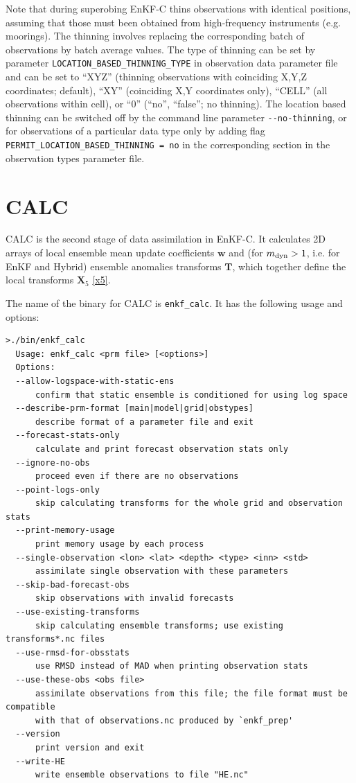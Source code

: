 \documentclass[11pt]{report}
\newcommand{\mb} {\mathbf}
\newcommand*\subtxt[1]{_{\textnormal{#1}}}
\begin{document}
Note that during superobing EnKF-C thins observations with identical positions, assuming that those must been obtained from high-frequency instruments (e.g. moorings).
The thinning involves replacing the corresponding batch of observations by batch average values.
The type of thinning can be set by parameter \verb|LOCATION_BASED_THINNING_TYPE| in observation data parameter file and can be set to ``XYZ'' (thinning observations with coinciding X,Y,Z coordinates; default), ``XY'' (coinciding X,Y coordinates only), ``CELL'' (all observations within cell), or ``0'' (``no'', ``false''; no thinning).
The location based thinning can be switched off by the command line parameter \verb|--no-thinning|, or for observations of a particular data type only by adding flag \verb|PERMIT_LOCATION_BASED_THINNING = no| in the corresponding section in the observation types parameter file.

\section{CALC}

CALC is the second stage of data assimilation in EnKF-C.
It calculates 2D arrays of local ensemble mean update coefficients $\mb w$ and (for $m\subtxt{dyn} > 1$, i.e. for EnKF and Hybrid) ensemble anomalies transforms $\mb T$, which together define the local transforms $\mb X_5$ \eqref{x5}.

The name of the binary for CALC is \verb|enkf_calc|.
It has the following usage and options:
\begin{Verbatim}[frame=single,fontsize=\footnotesize]
>./bin/enkf_calc 
  Usage: enkf_calc <prm file> [<options>]
  Options:
  --allow-logspace-with-static-ens
      confirm that static ensemble is conditioned for using log space
  --describe-prm-format [main|model|grid|obstypes]
      describe format of a parameter file and exit
  --forecast-stats-only
      calculate and print forecast observation stats only
  --ignore-no-obs
      proceed even if there are no observations
  --point-logs-only
      skip calculating transforms for the whole grid and observation stats
  --print-memory-usage
      print memory usage by each process
  --single-observation <lon> <lat> <depth> <type> <inn> <std>
      assimilate single observation with these parameters
  --skip-bad-forecast-obs
      skip observations with invalid forecasts
  --use-existing-transforms
      skip calculating ensemble transforms; use existing transforms*.nc files
  --use-rmsd-for-obsstats
      use RMSD instead of MAD when printing observation stats
  --use-these-obs <obs file>
      assimilate observations from this file; the file format must be compatible
      with that of observations.nc produced by `enkf_prep'
  --version
      print version and exit
  --write-HE
      write ensemble observations to file "HE.nc"
\end{Verbatim}
\end{document}
